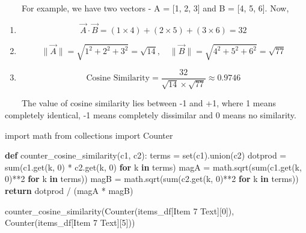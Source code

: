 \documentclass[
  letterpaper,
  DIV=11,
  numbers=noendperiod]{scrreprt}
\newenvironment{Shaded}{\begin{snugshade}}{\end{snugshade}}
\newcommand{\BuiltInTok}[1]{\textcolor[rgb]{0.00,0.23,0.31}{#1}}
\newcommand{\ControlFlowTok}[1]{\textcolor[rgb]{0.00,0.23,0.31}{\textbf{#1}}}
\newcommand{\DecValTok}[1]{\textcolor[rgb]{0.68,0.00,0.00}{#1}}
\newcommand{\ImportTok}[1]{\textcolor[rgb]{0.00,0.46,0.62}{#1}}
\newcommand{\KeywordTok}[1]{\textcolor[rgb]{0.00,0.23,0.31}{\textbf{#1}}}
\newcommand{\NormalTok}[1]{\textcolor[rgb]{0.00,0.23,0.31}{#1}}
\newcommand{\OperatorTok}[1]{\textcolor[rgb]{0.37,0.37,0.37}{#1}}
\newcommand{\StringTok}[1]{\textcolor[rgb]{0.13,0.47,0.30}{#1}}
\begin{document}
~~~~For example, we have two vectors - A = {[}1, 2, 3{]} and B = {[}4,
5, 6{]}. Now,

\begin{enumerate}
\def\labelenumi{\arabic{enumi}.}
\item
  \[\vec{A} \cdot \vec{B} = (1 \times 4) + (2 \times 5) + (3 \times 6) = 32\]
\item
  \[\|\vec{A}\| = \sqrt{1^2 + 2^2 + 3^2} = \sqrt{14}, \quad \|\vec{B}\| = \sqrt{4^2 + 5^2 + 6^2} = \sqrt{77}\]
\item
  \[\text{Cosine Similarity} = \frac{32}{\sqrt{14} \times \sqrt{77}} \approx 0.9746\]
\end{enumerate}

~~~~The value of cosine similarity lies between -1 and +1, where 1 means
completely identical, -1 means completely dissimilar and 0 means no
similarity.

\begin{Shaded}
\begin{Highlighting}[]
\ImportTok{import}\NormalTok{ math}
\ImportTok{from}\NormalTok{ collections }\ImportTok{import}\NormalTok{ Counter}

\KeywordTok{def}\NormalTok{ counter\_cosine\_similarity(c1, c2):}
\NormalTok{    terms }\OperatorTok{=} \BuiltInTok{set}\NormalTok{(c1).union(c2)}
\NormalTok{    dotprod }\OperatorTok{=} \BuiltInTok{sum}\NormalTok{(c1.get(k, }\DecValTok{0}\NormalTok{) }\OperatorTok{*}\NormalTok{ c2.get(k, }\DecValTok{0}\NormalTok{) }\ControlFlowTok{for}\NormalTok{ k }\KeywordTok{in}\NormalTok{ terms)}
\NormalTok{    magA }\OperatorTok{=}\NormalTok{ math.sqrt(}\BuiltInTok{sum}\NormalTok{(c1.get(k, }\DecValTok{0}\NormalTok{)}\OperatorTok{**}\DecValTok{2} \ControlFlowTok{for}\NormalTok{ k }\KeywordTok{in}\NormalTok{ terms))}
\NormalTok{    magB }\OperatorTok{=}\NormalTok{ math.sqrt(}\BuiltInTok{sum}\NormalTok{(c2.get(k, }\DecValTok{0}\NormalTok{)}\OperatorTok{**}\DecValTok{2} \ControlFlowTok{for}\NormalTok{ k }\KeywordTok{in}\NormalTok{ terms))}
    \ControlFlowTok{return}\NormalTok{ dotprod }\OperatorTok{/}\NormalTok{ (magA }\OperatorTok{*}\NormalTok{ magB)}


\NormalTok{counter\_cosine\_similarity(Counter(items\_df[}\StringTok{\textquotesingle{}Item 7 Text\textquotesingle{}}\NormalTok{][}\DecValTok{0}\NormalTok{]),}
\NormalTok{                Counter(items\_df[}\StringTok{\textquotesingle{}Item 7 Text\textquotesingle{}}\NormalTok{][}\DecValTok{5}\NormalTok{]))}
\end{Highlighting}
\end{Shaded}
\end{document}
